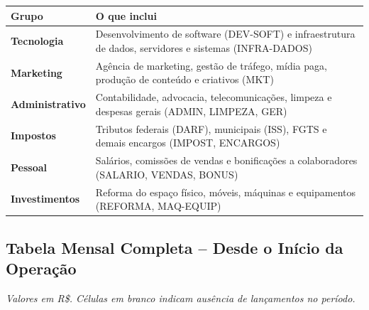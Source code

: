 \documentclass[12pt, a4paper]{article}
\begin{document}
\begin{table}[H]
    \centering
    \small
    \renewcommand{\arraystretch}{1.4}
    \begin{tabularx}{\textwidth}{l X}
        \toprule
        \rowcolor{tableHeader} \textbf{Grupo} & \textbf{O que inclui} \\
        \midrule
        \textbf{Tecnologia} & Desenvolvimento de software (DEV-SOFT) e infraestrutura de dados, servidores e sistemas (INFRA-DADOS) \\
        \textbf{Marketing} & Agência de marketing, gestão de tráfego, mídia paga, produção de conteúdo e criativos (MKT) \\
        \textbf{Administrativo} & Contabilidade, advocacia, telecomunicações, limpeza e despesas gerais (ADMIN, LIMPEZA, GER) \\
        \textbf{Impostos} & Tributos federais (DARF), municipais (ISS), FGTS e demais encargos (IMPOST, ENCARGOS) \\
        \textbf{Pessoal} & Salários, comissões de vendas e bonificações a colaboradores (SALARIO, VENDAS, BONUS) \\
        \textbf{Investimentos} & Reforma do espaço físico, móveis, máquinas e equipamentos (REFORMA, MAQ-EQUIP) \\
        \bottomrule
    \end{tabularx}
\end{table}

\subsection{Tabela Mensal Completa -- Desde o Início da Operação}

{\small \textit{Valores em R\$. Células em branco indicam ausência de lançamentos no período.}}
\end{document}
